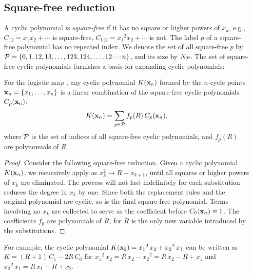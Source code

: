 \documentclass{ws-ijbc}
\begin{document}
\subsection{Square-free reduction}




A cyclic polynomial is \emph{square-free}
  if it has no square or higher powers of $x_k$,
e.g., $C_{12} = x_1 x_2 + \cdots$ is square-free,
  $C_{112} = {x_1}^2 x_2 + \cdots$ is not.
The label $p$ of a square-free polynomial
  has no repeated index.
We denote the set of all square-free $p$ by
$\mathcal P = \{0, 1, 12, 13, \ldots, 123, 124, \ldots, 12\cdots n\}$,
and its size by $N_\mathcal P$.
%
%
The set of square-free cyclic polynomials
  furnishes a basis for expanding cyclic polynomials:



\begin{theorem}
  For the logistic map ,
  any cyclic polynomial $K(\mathbf{x}_{n})$
  formed by the $n$-cycle points
  $\mathbf{x}_{n} = \{x_1, \ldots, x_n\}$
  is a linear combination of
  the square-free cyclic polynomials $C_p(\mathbf{x}_{n})$:
\[
  K(\mathbf{x}_{n}) = \sum_{p \in \mathcal P} f_p(R) \, C_p(\mathbf{x}_{n}),
\]
  where $\mathcal P$ %
  is the set of indices of all square-free cyclic polynomials,
  and $f_p(R)$ are polynomials of $R$.
  \label{thm:sqrfree}
\end{theorem}
%
%
\begin{proof}
Consider the following square-free reduction.
%
Given a cyclic polynomial $K(\mathbf{x}_{n})$,
  we recursively apply  as
  $x_k^2 \rightarrow R - x_{k+1}$,
  until all squares or higher powers of $x_k$ are eliminated.
The process will not last indefinitely
  for each substitution reduces the degree in $x_k$ %
  by one.
Since both the replacement rules and the original polynomial are cyclic,
  so is the final square-free polynomial.
Terms involving no $x_k$
  are collected to serve as the coefficient before $C_0(\mathbf{x}_{n}) \equiv 1$.
The coefficients $f_p$ are polynomials of $R$,
  for $R$ is the only new variable introduced by the substitutions.
\end{proof}
%
%
For example, the cyclic polynomial
  $K(\mathbf{x}_{2}) = {x_1}^2 \, x_2 + {x_2}^2 \, x_1$
can be written as $K = (R + 1) \, C_{1} - 2 R \, C_0$
for
${x_1}^2 \, x_2 = R \, x_2 - {x_2}^2 = R \, x_2 - R + x_1$ and
${x_2}^2 \, x_1 = R \, x_1 - R + x_2$.
\end{document}
